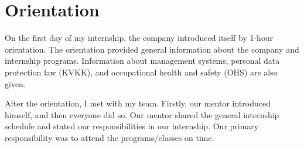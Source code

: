 \section{Orientation}

On the first day of my internship, the company introduced itself by 1-hour orientation. The orientation provided general information about the company and internship programs. Information about management systems, personal data protection law (KVKK), and occupational health and safety (OHS) are also given.

After the orientation, I met with my team. Firstly, our mentor introduced himself, and then everyone did so. Our mentor shared the general internship schedule and stated our responsibilities in our internship. Our primary responsibility was to attend the programs/classes on time.

